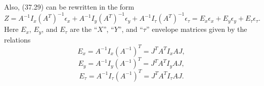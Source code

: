 Also, (37.29) can be rewritten in the form
\begin{equation}
Z = A^{-1} I_x (A^T)^{-1} \epsilon_x + A^{-1} I_y (A^T)^{-1}  \epsilon_y + A^{-1} I_{\tau}  (A^T)^{-1} \epsilon_{\tau} = E_x\epsilon_x + E_y\epsilon_y + E_{\tau}\epsilon_{\tau}.
\end{equation}
Here $E_x$, $E_y$, and $E_{\tau}$ are the ``$X$'', ``$Y$'', and ``$\tau$'' envelope matrices given by the relations
\begin{equation}
E_x = A^{-1} I_x (A^{-1})^T = J^TA^TI_x AJ,
\end{equation}
\begin{equation}
E_y = A^{-1} I_y (A^{-1})^T = J^TA^TI_y AJ,
\end{equation}
\begin{equation}
E_{\tau} = A^{-1}I_{\tau} (A^{-1})^T  = J^TA^TI_{\tau} AJ.
\end{equation}

